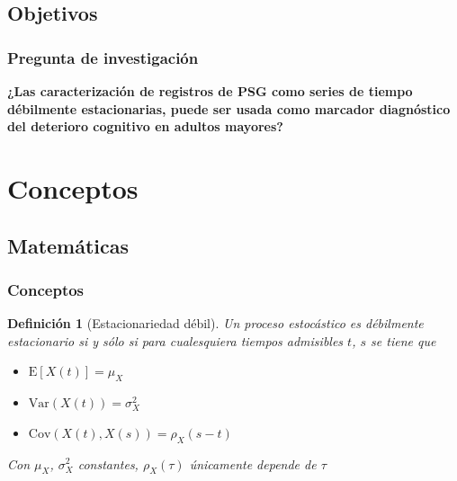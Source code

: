 \documentclass[serif,mathserif,professionalfont]{beamer}
\newtheorem{definicion}{Definición}
\newcommand{\E}[1]{\mathrm{E}\left[ #1 \right]}
\newcommand{\Var}[1]{\mathrm{Var}\left( #1 \right)}
\newcommand{\Cov}[1]{\mathrm{Cov}\left( #1 \right)}
\begin{document}
\subsection{Objetivos}

\begin{frame}\frametitle{Pregunta de investigaci\'on}
\textbf{
¿Las caracterizaci\'on de registros de PSG como 
series de tiempo d\'ebilmente estacionarias, puede ser usada como marcador diagn\'ostico 
del deterioro cognitivo en adultos mayores?
}
\end{frame}


\section{Conceptos}


\subsection{Matem\'aticas}

\begin{frame}\frametitle{Conceptos}
\begin{definicion}[Estacionariedad d\'ebil]
Un proceso estoc\'astico es d\'ebilmente estacionario si y s\'olo si para cualesquiera tiempos 
admisibles $t$, $s$ se tiene que
\begin{itemize}
\item $\E{X(t)} = \mu_X$
\item $\Var{X(t)} = \sigma^{2}_X$
\item $\Cov{X(t),X(s)} = \rho_X (s-t)$
\end{itemize}
Con $\mu_X$, $\sigma^{2}_X$ constantes, $\rho_X(\tau)$ \'unicamente depende de $\tau$
\end{definicion}
\end{frame}

\end{document}
